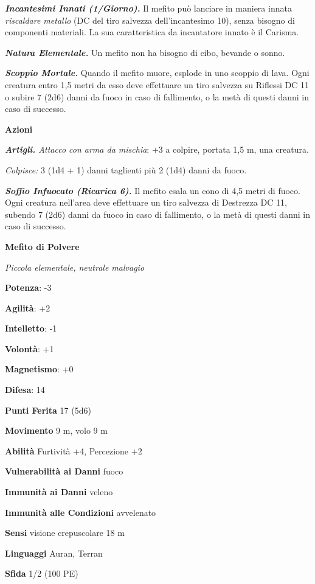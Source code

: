 \begin{multicols}{2}
\emph{\textbf{Incantesimi Innati (1/Giorno).}} Il mefito può lanciare in
maniera innata \emph{riscaldare metallo} (DC del tiro salvezza
dell'incantesimo 10), senza bisogno di componenti materiali. La sua
caratteristica da incantatore innato è il Carisma.

\emph{\textbf{Natura Elementale.}} Un mefito non ha bisogno di cibo,
bevande o sonno.

\emph{\textbf{Scoppio Mortale.}} Quando il mefito muore, esplode in uno
scoppio di lava. Ogni creatura entro 1,5 metri da esso deve effettuare
un tiro salvezza su Riflessi DC 11 o subire 7 (2d6) danni da fuoco in
caso di fallimento, o la metà di questi danni in caso di successo.

\textbf{Azioni}

\emph{\textbf{Artigli.} Attacco con arma da mischia}: +3 a colpire,
portata 1,5 m, una creatura.

\emph{Colpisce:} 3 (1d4 + 1) danni taglienti più 2 (1d4) danni da fuoco.

\emph{\textbf{Soffio Infuocato (Ricarica 6).}} Il mefito esala un cono
di 4,5 metri di fuoco. Ogni creatura nell'area deve effettuare un tiro
salvezza di Destrezza DC 11, subendo 7 (2d6) danni da fuoco in caso di
fallimento, o la metà di questi danni in caso di successo.



\textbf{Mefito di Polvere}

\emph{Piccola elementale, neutrale malvagio}

\textbf{Potenza}: -3

\textbf{Agilità}: +2

\textbf{Intelletto}: -1

\textbf{Volontà}: +1

\textbf{Magnetismo}: +0

\textbf{Difesa}: 14

\textbf{Punti Ferita} 17 (5d6)

\textbf{Movimento} 9 m, volo 9 m

\textbf{Abilità} Furtività +4, Percezione +2

\textbf{Vulnerabilità ai Danni} fuoco

\textbf{Immunità ai Danni} veleno

\textbf{Immunità alle Condizioni} avvelenato

\textbf{Sensi} visione crepuscolare 18 m

\textbf{Linguaggi} Auran, Terran

\textbf{Sfida} 1/2 (100 PE)


\end{multicols}
